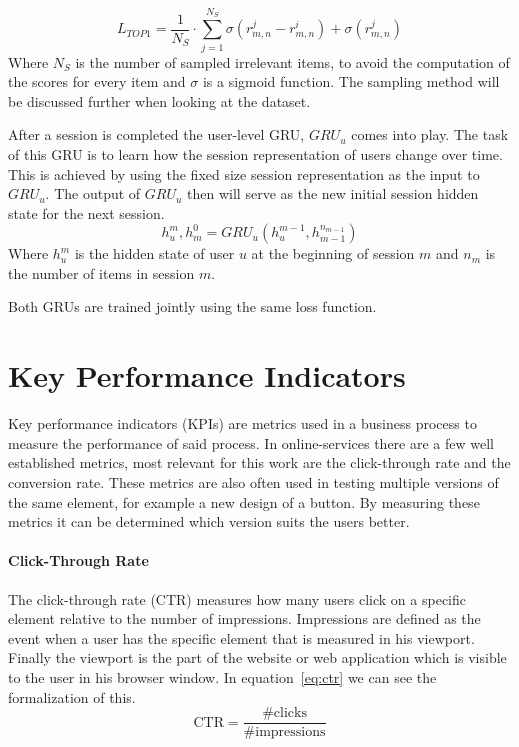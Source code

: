 \begin{equation}\label{eq:top1_loss}
    L_{TOP1} = \frac{1}{N_S} \cdot \sum_{j=1}^{N_S} \sigma(r_{m,n}^j - r_{m,n}^i) + \sigma(r_{m,n}^j)
\end{equation}
Where $N_S$ is the number of sampled irrelevant items, to avoid the computation of the scores for every item and $\sigma$ is a sigmoid function.
The sampling method will be discussed further when looking at the dataset.
\par
After a session is completed the user-level GRU, $GRU_u$ comes into play.
The task of this GRU is to learn how the session representation of users change over time.
This is achieved by using the fixed size session representation as the input to $GRU_u$.
The output of $GRU_u$ then will serve as the new initial session hidden state for the next session.
\begin{equation}\label{eq:hgru4rec_user}
    h_u^m, h_m^0 = GRU_u(h_u^{m-1}, h_{m-1}^{n_{m-1}})
\end{equation}
Where $h_u^m$ is the hidden state of user $u$ at the beginning of session $m$ and $n_m$ is the number of items in session $m$.
\par
Both GRUs are trained jointly using the same loss function.

\section{Key Performance Indicators}
Key performance indicators (KPIs) are metrics used in a business process to measure the performance of said process.
In online-services there are a few well established metrics, most relevant for this work are the click-through rate and the conversion rate.
These metrics are also often used in testing multiple versions of the same element, for example a new design of a button.
By measuring these metrics it can be determined which version suits the users better.
\paragraph{Click-Through Rate}
The click-through rate (CTR) measures how many users click on a specific element relative to the number of impressions.
Impressions are defined as the event when a user has the specific element that is measured in his viewport.
Finally the viewport is the part of the website or web application which is visible to the user in his browser window.
In equation~\ref{eq:ctr} we can see the formalization of this.
\begin{equation}\label{eq:ctr}
    \text{CTR} = \frac{\#\text{clicks}}{\#\text{impressions}}
\end{equation}
